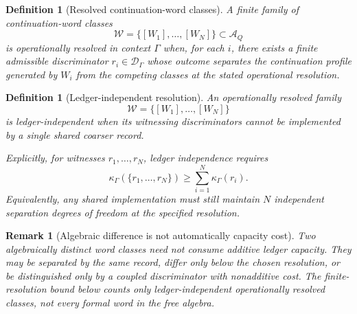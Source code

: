 \documentclass[11pt]{article}
\newtheorem{definition}[theorem]{Definition}
\newtheorem{remark}[theorem]{Remark}
\begin{document}
\begin{definition}[Resolved continuation-word classes]\label{def:operationally-resolved-words}
A finite family of continuation-word classes
\[
 \mathcal W=\{[W_1],\ldots,[W_N]\}\subset\mathcal A_Q
\]
is \emph{operationally resolved in context $\Gamma$} when, for each $i$, there exists a finite admissible discriminator $r_i\in\mathcal D_\Gamma$ whose outcome separates the continuation profile generated by $W_i$ from the competing classes at the stated operational resolution.
\end{definition}

\begin{definition}[Ledger-independent resolution]\label{def:ledger-independent-resolution}
An operationally resolved family
\[
 \mathcal W=\{[W_1],\ldots,[W_N]\}
\]
is \emph{ledger-independent} when its witnessing discriminators cannot be implemented by a single shared coarser record.

Explicitly, for witnesses $r_1,\ldots,r_N$, ledger independence requires
\[
 \kappa_\Gamma(\{r_1,\ldots,r_N\})
 \ge \sum_{i=1}^N \kappa_\Gamma(r_i).
\]
Equivalently, any shared implementation must still maintain $N$ independent separation degrees of freedom at the specified resolution.
\end{definition}

\begin{remark}[Algebraic difference is not automatically capacity cost]\label{rem:algebraic-vs-ledger-independence}
Two algebraically distinct word classes need not consume additive ledger capacity.  They may be separated by the same record, differ only below the chosen resolution, or be distinguished only by a coupled discriminator with nonadditive cost.  The finite-resolution bound below counts only ledger-independent operationally resolved classes, not every formal word in the free algebra.
\end{remark}
\end{document}
